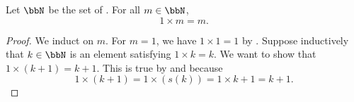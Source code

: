 \begin{lemma} \label{lemma:natural_number_one_left_identity_for_multiplication}
Let $\bbN$ be the set of . For all $m \in \bbN$,
$$1 \times m = m.$$
\end{lemma}

\begin{proof}
We induct on $m$. For $m = 1$, we have $1 \times 1 = 1$ by . Suppose inductively that $k \in \bbN$ is an element satisfying $1 \times k = k$. We want to show that $1 \times (k+1) = k+1$. This is true by  and  because 
$$1 \times (k+1) = 1 \times (s(k)) = 1 \times k + 1 = k + 1.$$
\end{proof}
